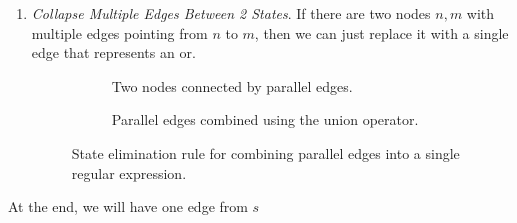 \begin{algo}
\begin{enumerate}
      \item \textit{Collapse Multiple Edges Between 2 States}. If there are two nodes $n, m$ with multiple edges pointing from $n$ to $m$, then we can just replace it with a single edge that represents an or. 

        \begin{figure}[H]
          \centering
          \begin{subfigure}[b]{0.48\textwidth}
            \centering
            \caption{Two nodes connected by parallel edges.}
            \label{fig:parallel_left}
          \end{subfigure}
          \hfill 
          \begin{subfigure}[b]{0.48\textwidth}
            \centering
            \caption{Parallel edges combined using the union operator.}
            \label{fig:parallel_right}
          \end{subfigure}
          \caption{State elimination rule for combining parallel edges into a single regular expression.}
          \label{fig:elimination_parallel}
        \end{figure}
    \end{enumerate}

    At the end, we will have one edge from $s$ 
  \end{algo}

